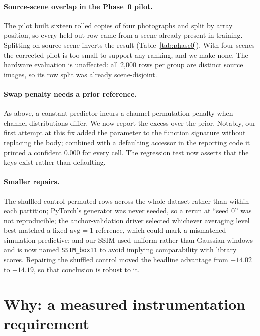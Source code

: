 \documentclass[10pt,conference]{article}
\begin{document}
\paragraph{Source-scene overlap in the Phase~0 pilot.} The pilot built sixteen rolled
copies of four photographs and split by array position, so every held-out row came from a
scene already present in training. Splitting on source scene inverts the result
(Table~\ref{tab:phase0}). With four scenes the corrected pilot is too small to support any
ranking, and we make none. The hardware evaluation is unaffected: all 2{,}000 rows per
group are distinct source images, so its row split was already scene-disjoint.

\paragraph{Swap penalty needs a prior reference.} As above, a constant predictor incurs a
channel-permutation penalty when channel distributions differ. We now report the excess
over the prior. Notably, our first attempt at this fix added the parameter to the function
signature without replacing the body; combined with a defaulting accessor in the reporting
code it printed a confident $0.000$ for every cell. The regression test now asserts that
the keys exist rather than defaulting.

\paragraph{Smaller repairs.} The shuffled control permuted rows across the whole dataset
rather than within each partition; PyTorch's generator was never seeded, so a rerun at
``seed 0'' was not reproducible; the anchor-validation driver selected whichever averaging
level best matched a fixed $\mathrm{avg}{=}1$ reference, which could mark a mismatched
simulation predictive; and our SSIM used uniform rather than Gaussian windows and is now
named \texttt{SSIM\_box11} to avoid implying comparability with library scores. Repairing
the shuffled control moved the headline advantage from $+14.02$ to $+14.19$, so that
conclusion is robust to it.

\section{Why: a measured instrumentation requirement}

\begin{table}[t]\centering\small
\caption{Reconstruction quality vs.\ training-set size (MSSIM). Natural is flat.}
\label{tab:scale}

\end{table}
\end{document}
